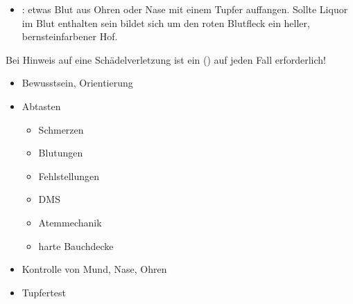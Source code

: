 {\begin{itemize}
  \item
  \label{topic:tupfertest}:
  etwas Blut aus Ohren oder Nase mit einem Tupfer auffangen.
  Sollte Liquor im Blut enthalten sein bildet sich um den
  roten Blutfleck ein heller, bernsteinfarbener Hof.
\end{itemize}
Bei Hinweis auf eine Schädelverletzung ist ein
 () auf jeden
Fall erforderlich! }{
\begin{itemize}
  \item Bewusstsein, Orientierung
  \item Abtasten
  \begin{itemize}
    \item Schmerzen
    \item Blutungen
    \item Fehlstellungen
    \item DMS
    \item Atemmechanik
    \item harte Bauchdecke
  \end{itemize} 
  \item Kontrolle von Mund, Nase, Ohren
  \item Tupfertest
\end{itemize}
}{}{}{}


% 
% 
% 







